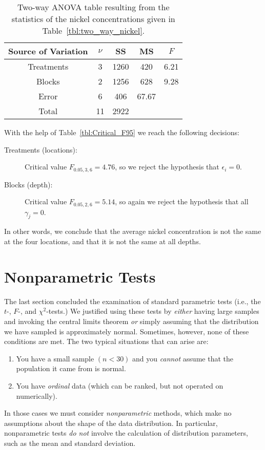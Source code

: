 \begin{example2}
\begin{table}[H]
\begin{tabular}{|c|c|c|c|c|}
\hline
\bf{Source of Variation} & $\nu$ & \bf{SS} & \bf{MS} & $F$ \\ \hline	
{Treatments} & 3 & 1260 & 420 & 6.21\\ \hline
{Blocks} & 2 & 1256 & 628 & 9.28 \\ \hline
{Error} & 6 & 406 & 67.67 & \\ \hline
{Total} & 11 & 2922 &  & \\ \hline
\end{tabular}
\caption{Two-way ANOVA table resulting from the statistics of the nickel concentrations given in Table~\ref{tbl:two_way_nickel}.}
\label{tbl:two_way_F}
\end{table}
\noindent
With the help of Table~\ref{tbl:Critical_F95} we reach the following decisions:
\begin{description}

\item [Treatments (locations):] Critical value $F_{0.05,3,6} = 4.76$, so we reject the hypothesis that $\epsilon_i = 0$.
\item [Blocks (depth):]  Critical value $F_{0.05,2,6} = 5.14$, so again we reject the hypothesis that all $\gamma_j = 0$.
\end{description}
In other words, we conclude that the average nickel concentration is not the same at the four 
locations, and that it is not the same at all depths.
\end{example2}
\section{Nonparametric Tests}

	The last section concluded the examination of standard parametric tests (i.e., the $t$-, $F$-, and $\chi^2$-tests.)  
We justified using these tests by \emph{either} having large samples and invoking the central limits 
theorem \emph{or} simply assuming that the distribution we have sampled is approximately normal.  
Sometimes, however, none of these conditions are met.  The two typical situations that can arise are:
\begin{enumerate}
\item You have a small sample $(n < 30)$ and you \emph{cannot} assume that the population it came from is normal.
\item You have \emph{ordinal} data (which can be ranked, but not operated on numerically).
\end{enumerate}
In those cases we must consider \emph{nonparametric} methods, which make no assumptions about the shape of 
the data distribution.  In particular, nonparametric tests \emph{do not} involve the calculation
of distribution parameters, such as the mean and standard deviation.

